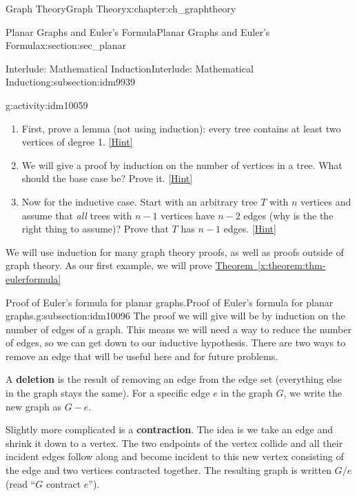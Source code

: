 \documentclass[oneside,10pt,]{book}
\newcommand{\terminology}[1]{\textbf{#1}}
\numberwithin{equation}{chapter}
\begin{document}
\begin{chapterptx}{Graph Theory}{}{Graph Theory}{}{}{x:chapter:ch_graphtheory}
\begin{sectionptx}{Planar Graphs and Euler's Formula}{}{Planar Graphs and Euler's Formula}{}{}{x:section:sec_planar}
\begin{subsectionptx}{Interlude: Mathematical Induction}{}{Interlude: Mathematical Induction}{}{}{g:subsection:idm9939}
\begin{activity}{}{g:activity:idm10059}
\begin{enumerate}[font=\bfseries,label=(\alph*),ref=\alph*]
\item{}First, prove a lemma (not using induction): every tree contains at least two vertices of degree 1.%
\space\hspace*{0pt}\hfill{\tiny\hyperlink{g:hint:idm10068-back}{[Hint]}}\item{}We will give a proof by induction on the number of vertices in a tree.  What should the base case be?  Prove it.%
\space\hspace*{0pt}\hfill{\tiny\hyperlink{g:hint:idm10076-back}{[Hint]}}\item{}Now for the inductive case.  Start with an arbitrary tree \(T\) with \(n\) vertices and assume that \emph{all} trees with \(n-1\) vertices have \(n-2\) edges (why is the the right thing to assume)?  Prove that \(T\) has \(n-1\) edges.%
\space\hspace*{0pt}\hfill{\tiny\hyperlink{g:hint:idm10089-back}{[Hint]}}\end{enumerate}
\end{activity}
We will use induction for many graph theory proofs, as well as proofs outside of graph theory.  As our first example, we will prove \hyperref[x:theorem:thm-eulerformula]{Theorem~\ref{x:theorem:thm-eulerformula}}%
\end{subsectionptx}
%
%
\typeout{************************************************}
\typeout{************************************************}
%
\begin{subsectionptx}{Proof of Euler's formula for planar graphs.}{}{Proof of Euler's formula for planar graphs.}{}{}{g:subsection:idm10096}
The proof we will give will be by induction on the number of edges of a graph.  This means we will need a way to reduce the number of edges, so we can get down to our inductive hypothesis.  There are two ways to remove an edge that will be useful here and for future problems.%
\par
{} A \terminology{deletion} is the result of removing an edge from the edge set (everything else in the graph stays the same).  For a specific edge \(e\) in the graph \(G\), we write the new graph as \(G - e\).%
\par
{} Slightly more complicated is a \terminology{contraction}.  The idea is we take an edge and shrink it down to a vertex.  The two endpoints of the vertex collide and all their incident edges follow along and become incident to this new vertex consisting of the edge and two vertices contracted together.  The resulting graph is written \(G/e\) (read ``\(G\) contract \(e\)'').%

\end{subsectionptx}
\end{sectionptx}
\end{chapterptx}
\end{document}
